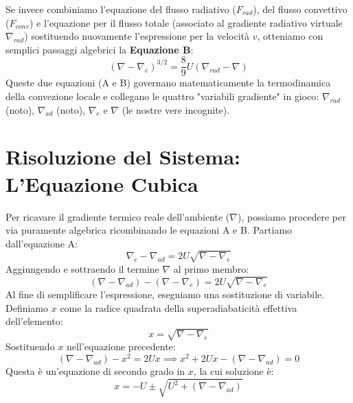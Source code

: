 Se invece combiniamo l'equazione del flusso radiativo ($F_{rad}$), del flusso convettivo ($F_{conv}$) e l'equazione per il flusso totale (associato al gradiente radiativo virtuale $\nabla_{rad}$) sostituendo nuovamente l'espressione per la velocità $v$, otteniamo con semplici passaggi algebrici la \textbf{Equazione B}:
\begin{equation}
(\nabla - \nabla_e)^{3/2} = \frac{8}{9} U (\nabla_{rad} - \nabla)
\end{equation}
Queste due equazioni (A e B) governano matematicamente la termodinamica della convezione locale e collegano le quattro "variabili gradiente" in gioco: $\nabla_{rad}$ (noto), $\nabla_{ad}$ (noto), $\nabla_e$ e $\nabla$ (le nostre vere incognite).

\section{Risoluzione del Sistema: L'Equazione Cubica}

Per ricavare il gradiente termico reale dell'ambiente ($\nabla$), possiamo procedere per via puramente algebrica ricombinando le equazioni A e B.
Partiamo dall'equazione A:
\begin{equation}
\nabla_e - \nabla_{ad} = 2 U \sqrt{\nabla - \nabla_e}
\end{equation}
Aggiungendo e sottraendo il termine $\nabla$ al primo membro:
\begin{equation}
(\nabla - \nabla_{ad}) - (\nabla - \nabla_e) = 2 U \sqrt{\nabla - \nabla_e}
\end{equation}
Al fine di semplificare l'espressione, eseguiamo una sostituzione di variabile. Definiamo $x$ come la radice quadrata della superadiabaticità effettiva dell'elemento:
\begin{equation}
x = \sqrt{\nabla - \nabla_e}
\end{equation}
Sostituendo $x$ nell'equazione precedente:
\begin{equation}
(\nabla - \nabla_{ad}) - x^2 = 2 U x \implies x^2 + 2 U x - (\nabla - \nabla_{ad}) = 0
\end{equation}
Questa è un'equazione di secondo grado in $x$, la cui soluzione è:
\begin{equation}
x = -U \pm \sqrt{U^2 + (\nabla - \nabla_{ad})}
\end{equation}

